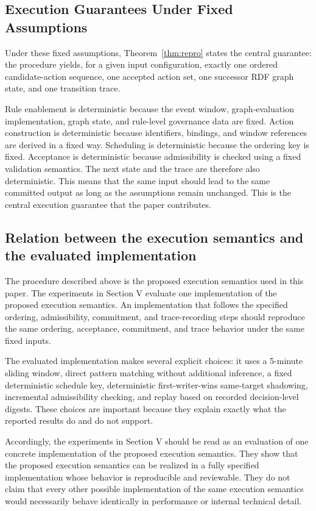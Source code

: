 \documentclass{ieeeaccess}
\theoremstyle{definition}
\theoremstyle{plain}
\theoremstyle{remark}
\begin{document}
\subsection{Execution Guarantees Under Fixed Assumptions}

Under these fixed assumptions, Theorem~\ref{thm:repro} states the central guarantee: the procedure yields, for a given input configuration, exactly one ordered candidate-action sequence, one accepted action set, one successor RDF graph state, and one transition trace.

Rule enablement is deterministic because the event window, graph-evaluation implementation, graph state, and rule-level governance data are fixed. Action construction is deterministic because identifiers, bindings, and window references are derived in a fixed way. Scheduling is deterministic because the ordering key is fixed. Acceptance is deterministic because admissibility is checked using a fixed validation semantics. The next state and the trace are therefore also deterministic. This means that the same input should lead to the same committed output as long as the assumptions remain unchanged. This is the central execution guarantee that the paper contributes.

\subsection{Relation between the execution semantics and the evaluated implementation}

The procedure described above is the proposed execution semantics used in this paper. The experiments in Section V evaluate one implementation of the proposed execution semantics. An implementation that follows the specified ordering, admissibility, commitment, and trace-recording steps should reproduce the same ordering, acceptance, commitment, and trace behavior under the same fixed inputs.

The evaluated implementation makes several explicit choices: it uses a 5-minute sliding window, direct pattern matching without additional inference, a fixed deterministic schedule key, deterministic first-writer-wins same-target shadowing, incremental admissibility checking, and replay based on recorded decision-level digests. These choices are important because they explain exactly what the reported results do and do not support.

Accordingly, the experiments in Section V should be read as an evaluation of one concrete implementation of the proposed execution semantics. They show that the proposed execution semantics can be realized in a fully specified implementation whose behavior is reproducible and reviewable. They do not claim that every other possible implementation of the same execution semantics would necessarily behave identically in performance or internal technical detail.
\end{document}
